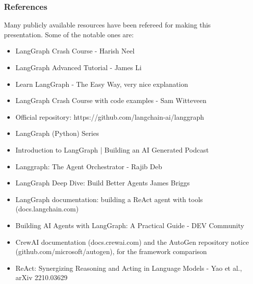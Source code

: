 

\begin{frame}\frametitle{References}
Many publicly available resources have been refereed for making this presentation. Some of the notable ones are:
\footnotesize
\begin{itemize}
\item LangGraph Crash Course - Harish Neel
\item LangGraph Advanced Tutorial  - James Li
\item Learn LangGraph - The Easy Way, very nice explanation
\item LangGraph Crash Course with code examples - Sam Witteveen 
\item Official repository: https://github.com/langchain-ai/langgraph
\item LangGraph (Python) Series
\item Introduction to LangGraph | Building an AI Generated Podcast 
\item Langgraph: The Agent Orchestrator - Rajib Deb 
\item LangGraph Deep Dive: Build Better Agents James Briggs
\item LangGraph documentation: building a ReAct agent with tools (docs.langchain.com)
\item Building AI Agents with LangGraph: A Practical Guide - DEV Community
\item CrewAI documentation (docs.crewai.com) and the AutoGen repository notice (github.com/microsoft/autogen), for the framework comparison
\item ReAct: Synergizing Reasoning and Acting in Language Models - Yao et al., arXiv 2210.03629
\end{itemize}

\end{frame}
